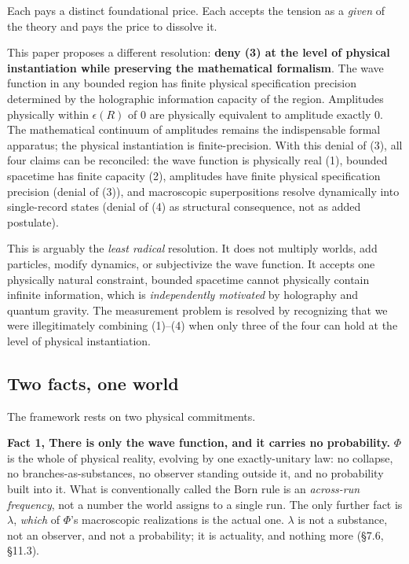 \documentclass[11pt,a4paper]{article}
\begin{document}
Each pays a distinct foundational price. Each accepts the tension as a \emph{given} of the theory and pays the price to dissolve it.

This paper proposes a different resolution: \textbf{deny (3) at the level of physical instantiation while preserving the mathematical formalism}. The wave function in any bounded region has finite physical specification precision determined by the holographic information capacity of the region. Amplitudes physically within $\epsilon(R)$ of $0$ are physically equivalent to amplitude exactly $0$. The mathematical continuum of amplitudes remains the indispensable formal apparatus; the physical instantiation is finite-precision. With this denial of (3), all four claims can be reconciled: the wave function is physically real (1), bounded spacetime has finite capacity (2), amplitudes have finite physical specification precision (denial of (3)), and macroscopic superpositions resolve dynamically into single-record states (denial of (4) as structural consequence, not as added postulate).

This is arguably the \emph{least radical} resolution. It does not multiply worlds, add particles, modify dynamics, or subjectivize the wave function. It accepts one physically natural constraint, bounded spacetime cannot physically contain infinite information, which is \emph{independently motivated} by holography and quantum gravity. The measurement problem is resolved by recognizing that we were illegitimately combining (1)–(4) when only three of the four can hold at the level of physical instantiation.

\subsection{Two facts, one world}

The framework rests on two physical commitments.

\textbf{Fact 1, There is only the wave function, and it carries no probability.} $\Phi$ is the whole of physical reality, evolving by one exactly-unitary law: no collapse, no branches-as-substances, no observer standing outside it, and no probability built into it. What is conventionally called the Born rule is an \emph{across-run frequency}, not a number the world assigns to a single run. The only further fact is $\lambda$, \emph{which} of $\Phi$'s macroscopic realizations is the actual one. $\lambda$ is not a substance, not an observer, and not a probability; it is actuality, and nothing more (§7.6, §11.3).
\end{document}
